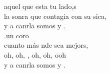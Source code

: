 \begin{cancion}[Es tu amigo es][Kairoi]
\begin{chorus}
	aquel que esta tu lado,s \\
	la sonra que contagia con su sica,\\
	y a canrla somos  y .\\
	.un coro  \\
	cuanto más nde sea mejors, \\
	oh, oh, , oh, oh,  ooh \\
	y a canrla somos  y .  \\
	\end{chorus}%
	\jump\\
\end{cancion}%
